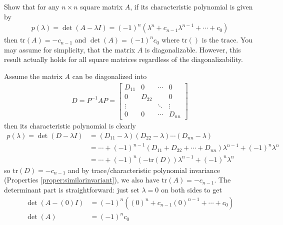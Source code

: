 \begin{Exercise}
Show that for any $n \times n$ square matrix $A$, if its characteristic polynomial is given by
\begin{align*}
p(\lambda) = \det(A-\lambda I) = (-1)^n(\lambda^n + c_{n-1}\lambda^{n-1} + \cdots + c_0)
\end{align*}
then $\text{tr}(A) = -c_{n-1}$ and $\det(A) = (-1)^nc_0$ where $\text{tr}()$ is the trace. You may assume for simplicity, that the matrix $A$ is diagonalizable. However, this result actually holds for all square matrices regardless of the diagonalizability.
\end{Exercise}
\begin{Answer}
Assume the matrix $A$ can be diagonalized into
\begin{align*}
D = P^{-1}AP =
\begin{bmatrix}
D_{11} & 0 & \cdots & 0 \\
0 & D_{22} & & 0 \\
\vdots & & \ddots & \vdots \\
0 & 0 & \cdots & D_{nn}
\end{bmatrix}
\end{align*}
then its characteristic polynomial is clearly 
\begin{align*}
p(\lambda) = \det(D-\lambda I) &= (D_{11}-\lambda)(D_{22}-\lambda)\cdots(D_{nn}-\lambda) \\
&= \cdots + (-1)^{n-1}(D_{11}+D_{22}+\cdots+D_{nn})\lambda^{n-1}+(-1)^n\lambda^n \\
&= \cdots + (-1)^{n}(-\text{tr}(D))\lambda^{n-1}+(-1)^n\lambda^n
\end{align*}
so $\text{tr}(D) = -c_{n-1}$ and by trace/characteristic polynomial invariance (Properties \ref{proper:similarinvariant}), we also have $\text{tr}(A) = -c_{n-1}$. The determinant part is straightforward: just set $\lambda = 0$ on both sides to get
\begin{align*}
\det(A-(0)I) &= (-1)^n((0)^n + c_{n-1}(0)^{n-1} + \cdots + c_0) \\
\det(A) &= (-1)^nc_0
\end{align*}
\end{Answer}

